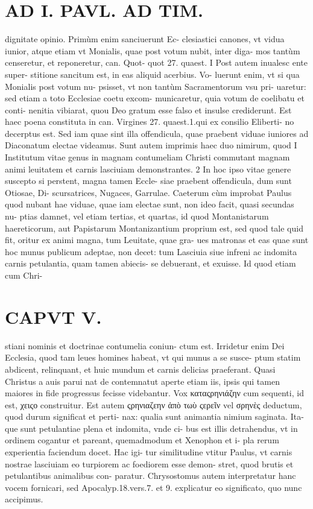 \documentclass{article}
\begin{document}
\begin{pages}
\section*{AD I. PAVL. AD TIM. }
\marginpar{[ p.202 ]}\pstart dignitate opinio. Primùm enim sanciuerunt Ec- clesiastici canones, vt vidua iunior, atque etiam vt Monialis, quae post votum nubit, inter diga- mos tantùm censeretur, et reponeretur, can. Quot- quot 27. quaest. I Post autem inualesc ente super- stitione sancitum est, in eas aliquid acerbius. Vo- luerunt enim, vt si qua Monialis post votum nu- psisset, vt non tantùm Sacramentorum vsu pri- uaretur: sed etiam a toto Ecclesiae coetu excom- municaretur, quia votum de coelibatu et conti- nenitia vibiarat, quou Deo gratum esse falso et insulse crediderunt. Est haec poena constituta in can. Virgines 27. quaest.1.qui ex consilio Eliberti- no decerptus est.  \pend\pstart Sed iam quae sint illa offendicula, quae praebent viduae iuniores ad Diaconatum electae videamus. Sunt autem imprimis haec duo nimirum, quod I Institutum vitae genus in magnam contumeliam Christi commutant magnam animi leuitatem et carnis lasciuiam demonstrantes. 2 In hoc ipso vitae genere suscepto si perstent, magna tamen Eccle- siae praebent offendicula, dum sunt Otiosae, Di- scursatrices, Nugaces, Garrulae. Caeterum cùm improbat Paulus quod nubant hae viduae, quae iam electae sunt, non ideo facit, quasi secundas nu- ptias damnet, vel etiam tertias, et quartas, id quod Montanistarum haereticorum, aut Papistarum Montanizantium proprium est, sed quod tale quid fit, oritur ex animi magna, tum Leuitate, quae gra- ues matronas et eas quae sunt hoc munus publicum adeptae, non decet: tum Lasciuia siue infreni ac indomita carnis petulantia, quam tamen abiecis- se debuerant, et exuisse. Id quod etiam cum Chri-  \pend
\section*{CAPVT V. }
\marginpar{[ p.283 ]}\pstart stiani nominis et doctrinae contumelia coniun- ctum est. Irridetur enim Dei Ecclesia, quod tam leues homines habeat, vt qui munus a se susce- ptum statim abdicent, relinquant, et huic mundum et carnis delicias praeferant. Quasi Christus a auis parui nat de contemnatut aperte etiam iis, ipsis qui tamen maiores in fide progressus fecisse videbantur.  \pend\pstart Vox καταςρηνιάζην cum sequenti, id est, χειςο construitur. Est autem ςρηνιαζεην ἀπὸ τωὺ ςερεῖν vel σρηνὲς deductum, quod durum significat et perti- nax: qualia sunt animantia nimium saginata. Ita- que sunt petulantiae plena et indomita, vnde ci- bus est illis detrahendus, vt in ordinem cogantur et pareant, quemadmodum et Xenophon et i- pla rerum experientia faciendum docet. Hac igi- tur similitudine vtitur Paulus, vt carnis nostrae lasciuiam eo turpiorem ac foediorem esse demon- stret, quod brutis et petulantibus animalibus con- paratur.  \pend\pstart Chrysostomus autem interpretatur hanc vocem fornicari, sed Apocalyp.18.vers.7. et 9. explicatur eo significato, quo nunc accipimus.  \pend
{}
{}

\end{pages}
\end{document}
